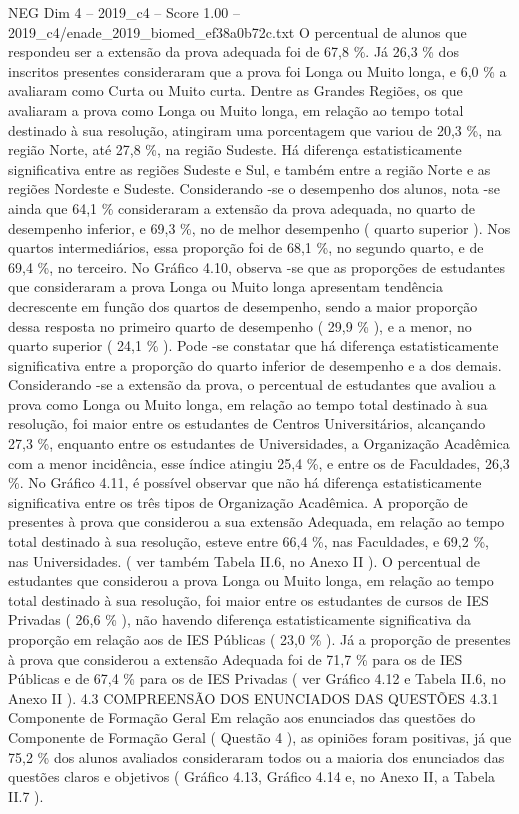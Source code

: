 \begin{textsample}{NEG Dim 4 – 2019\_c4 – Score 1.00 – 2019\_c4/enade\_2019\_biomed\_ef38a0b72c.txt}
O percentual de alunos que respondeu ser a extensão da prova adequada foi de 67,8 \%.
Já 26,3 \% dos inscritos presentes consideraram que a prova foi Longa ou Muito longa, e 6,0 \% a avaliaram como Curta ou Muito curta.
Dentre as Grandes Regiões, os que avaliaram a prova como Longa ou Muito longa, em relação ao tempo total destinado à sua resolução, atingiram uma porcentagem que variou de 20,3 \%, na região Norte, até 27,8 \%, na região Sudeste.
Há diferença estatisticamente significativa entre as regiões Sudeste e Sul, e também entre a região Norte e as regiões Nordeste e Sudeste.
Considerando -se o desempenho dos alunos, nota -se ainda que 64,1 \% consideraram a extensão da prova adequada, no quarto de desempenho inferior, e 69,3 \%, no de melhor desempenho ( quarto superior ).
Nos quartos intermediários, essa proporção foi de 68,1 \%, no segundo quarto, e de 69,4 \%, no terceiro.
No Gráfico 4.10, observa -se que as proporções de estudantes que consideraram a prova Longa ou Muito longa apresentam tendência decrescente em função dos quartos de desempenho, sendo a maior proporção dessa resposta no primeiro quarto de desempenho ( 29,9 \% ), e a menor, no quarto superior ( 24,1 \% ).
Pode -se constatar que há diferença estatisticamente significativa entre a proporção do quarto inferior de desempenho e a dos demais.
Considerando -se a extensão da prova, o percentual de estudantes que avaliou a prova como Longa ou Muito longa, em relação ao tempo total destinado à sua resolução, foi maior entre os estudantes de Centros Universitários, alcançando 27,3 \%, enquanto entre os estudantes de Universidades, a Organização Acadêmica com a menor incidência, esse índice atingiu 25,4 \%, e entre os de Faculdades, 26,3 \%.
No Gráfico 4.11, é possível observar que não há diferença estatisticamente significativa entre os três tipos de Organização Acadêmica.
A proporção de presentes à prova que considerou a sua extensão Adequada, em relação ao tempo total destinado à sua resolução, esteve entre 66,4 \%, nas Faculdades, e 69,2 \%, nas Universidades. ( ver também Tabela II.6, no Anexo II ).
O percentual de estudantes que considerou a prova Longa ou Muito longa, em relação ao tempo total destinado à sua resolução, foi maior entre os estudantes de cursos de IES Privadas ( 26,6 \% ), não havendo diferença estatisticamente significativa da proporção em relação aos de IES Públicas ( 23,0 \% ).
Já a proporção de presentes à prova que considerou a extensão Adequada foi de 71,7 \% para os de IES Públicas e de 67,4 \% para os de IES Privadas ( ver Gráfico 4.12 e Tabela II.6, no Anexo II ). 4.3 COMPREENSÃO DOS ENUNCIADOS DAS QUESTÕES 4.3.1 Componente de Formação Geral Em relação aos enunciados das questões do Componente de Formação Geral ( Questão 4 ), as opiniões foram positivas, já que 75,2 \% dos alunos avaliados consideraram todos ou a maioria dos enunciados das questões claros e objetivos ( Gráfico 4.13, Gráfico 4.14 e, no Anexo II, a Tabela II.7 ).

\end{textsample}
